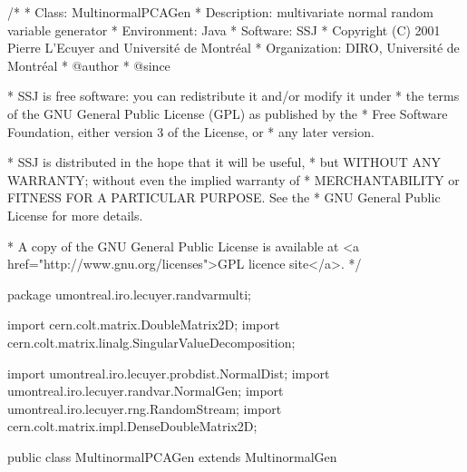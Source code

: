 \begin{code}
\begin{hide}
/*
 * Class:        MultinormalPCAGen
 * Description:  multivariate normal random variable generator
 * Environment:  Java
 * Software:     SSJ 
 * Copyright (C) 2001  Pierre L'Ecuyer and Université de Montréal
 * Organization: DIRO, Université de Montréal
 * @author       
 * @since

 * SSJ is free software: you can redistribute it and/or modify it under
 * the terms of the GNU General Public License (GPL) as published by the
 * Free Software Foundation, either version 3 of the License, or
 * any later version.

 * SSJ is distributed in the hope that it will be useful,
 * but WITHOUT ANY WARRANTY; without even the implied warranty of
 * MERCHANTABILITY or FITNESS FOR A PARTICULAR PURPOSE.  See the
 * GNU General Public License for more details.

 * A copy of the GNU General Public License is available at
   <a href="http://www.gnu.org/licenses">GPL licence site</a>.
 */
\end{hide}
package umontreal.iro.lecuyer.randvarmulti;

   import cern.colt.matrix.DoubleMatrix2D;
   import cern.colt.matrix.linalg.SingularValueDecomposition;
\begin{hide}
import umontreal.iro.lecuyer.probdist.NormalDist;
import umontreal.iro.lecuyer.randvar.NormalGen;
import umontreal.iro.lecuyer.rng.RandomStream;
import cern.colt.matrix.impl.DenseDoubleMatrix2D;
\end{hide}

public class MultinormalPCAGen extends MultinormalGen\begin{hide} {
   private double[] lambda;

   private static SingularValueDecomposition getSvd (DoubleMatrix2D sigma) {
      return (new SingularValueDecomposition (sigma));
   }

   private DoubleMatrix2D decompPCA (SingularValueDecomposition svd) {
      DoubleMatrix2D D = svd.getS ();
      // Calculer la racine carree des valeurs propres
      for (int i = 0; i < D.rows(); ++i) {
         lambda[i] = D.getQuick (i, i);
         D.setQuick (i, i, Math.sqrt (D.getQuick (i, i)));
      }
      DoubleMatrix2D P = svd.getV();
      return P.zMult (D, null);
   }

   private void initL() {
      if (mu.length != sigma.rows() || mu.length != sigma.columns())
         throw new IllegalArgumentException
            ("Incompatible mean vector and covariance matrix");
      lambda = new double[mu.length];
      sqrtSigma = decompPCA (getSvd(sigma));
   }
\end{hide}\end{code}


